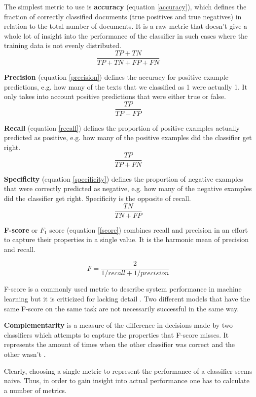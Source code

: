 The simplest metric to use is \textbf{accuracy} (equation \ref{accuracy}), which defines the fraction of correctly classified documents (true positives and true negatives) in relation to the total number of documents.
It is a raw metric that doesn't give a whole lot of insight into the performance of the classifier in such cases where the training data is not evenly distributed.
\begin{equation}\label{accuracy}
  \dfrac{TP + TN}{TP+TN+FP+FN}
\end{equation}

\textbf{Precision} (equation \ref{precision}) defines the accuracy for positive example predictions, e.g. how many of the texts that we classified as 1 were actually 1.
It only takes into account positive predictions that were either true or false.
\begin{equation}\label{precision}
  \dfrac{TP}{TP+FP}
\end{equation}

\textbf{Recall} (equation \ref{recall}) defines the proportion of positive examples actually predicted as positive, e.g. how many of the positive examples did the classifier get right.
\begin{equation}\label{recall}
  \dfrac{TP}{TP+FN}
\end{equation}

\textbf{Specificity} (equation \ref{specificity}) defines the proportion of negative examples that were correctly predicted as negative, e.g. how many of the negative examples did the classifier get right.
Specificity is the opposite of recall.
\begin{equation}\label{specificity}
  \dfrac{TN}{TN+FP}
\end{equation}

\textbf{F-score} or $F_1$ score (equation \ref{fscore}) combines recall and precision in an effort to capture their properties in a single value.
It is the harmonic mean of precision and recall.

\begin{equation}\label{fscore}
  F=\dfrac{2}{1/recall + 1/precision}
\end{equation}

F-score is a commonly used metric to describe system performance in machine learning but it is criticized for lacking detail \cite{derczynski2016}.
Two different models that have the same F-score on the same task are not necessarily successful in the same way.

\textbf{Complementarity} \cite{brill1998} is a measure of the difference in decisions made by two classifiers which attempts to capture the properties that F-score misses.
It represents the amount of times when the other classifier was correct and the other wasn't \cite{derczynski2016}.

Clearly, choosing a single metric to represent the performance of a classifier seems naive.
Thus, in order to gain insight into actual performance one has to calculate a number of metrics.
